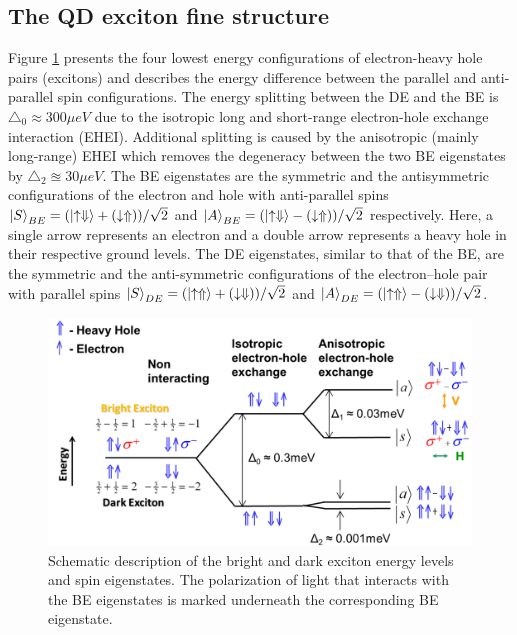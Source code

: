 \subsection{The QD exciton fine structure}
Figure \ref{fig:energy_structure}  presents the four lowest energy configurations of electron-heavy hole pairs (excitons) and describes the energy difference between the parallel and anti-parallel spin configurations. The energy splitting between the DE and the BE is $\triangle_0 \approx 300 \mu eV$ due to the isotropic long and short-range electron-hole exchange interaction (EHEI). Additional splitting is caused by the anisotropic (mainly long-range) EHEI which removes the degeneracy between the two BE eigenstates by $\triangle_2 \approxeq 30 \mu eV $. The BE eigenstates are the symmetric and the antisymmetric configurations of the electron and hole with anti-parallel spins $ \ket{S}_{BE} = (\ket{\uparrow\Downarrow}+(\downarrow\Uparrow))/\sqrt{2}$ and  $ \ket{A}_{BE} = (\ket{\uparrow\Downarrow}-(\downarrow\Uparrow))/\sqrt{2}$ respectively. Here, a single arrow represents an electron and a double arrow represents a heavy hole in their respective ground levels. The DE eigenstates, similar to that of the BE, are the symmetric and the anti-symmetric configurations of the electron–hole pair with parallel spins $ \ket{S}_{DE} = (\ket{\uparrow\Uparrow}+(\downarrow\Downarrow))/\sqrt{2}$ and $ \ket{A}_{DE} = (\ket{\uparrow\Uparrow}-(\downarrow\Downarrow))/\sqrt{2}$.
\begin{figure}[H]
	\centering
	\includegraphics[scale=0.32]{figures/energy_structure.png}
	\caption{Schematic description of the bright and dark exciton energy levels and spin eigenstates. The polarization of light that interacts with the BE eigenstates is marked underneath the corresponding BE eigenstate.}
	\label{fig:energy_structure}
\end{figure}
